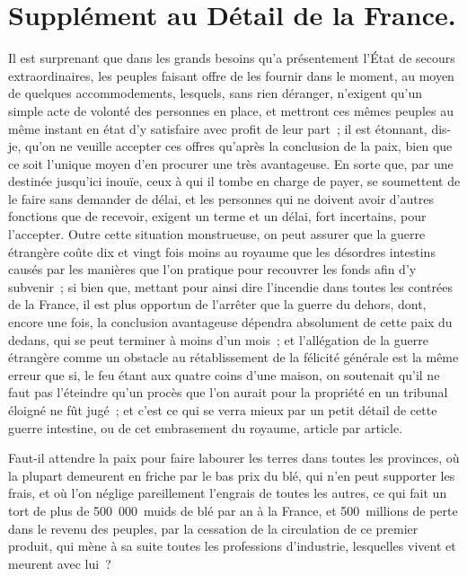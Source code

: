 \documentclass[french,twoside]{book} %
\begin{document}
\section[{Supplément au Détail de la France.}]{Supplément au Détail de la France.}
\noindent Il est surprenant que dans les grands besoins qu’a présentement l’État de secours extraordinaires, les peuples faisant offre de les fournir dans le moment, au moyen de quelques accommodements, lesquels, sans rien déranger, n’exigent qu’un simple acte de volonté des personnes en place, et mettront ces mêmes peuples au même instant en état d’y satisfaire avec profit de leur part ; il est étonnant, dis-je, qu’on ne veuille accepter ces offres qu’après la conclusion de la paix, bien que ce soit l’unique moyen d’en procurer une très avantageuse. En sorte que, par une destinée jusqu’ici inouïe, ceux à qui il tombe en charge de payer, se soumettent de le faire sans demander de délai, et les personnes qui ne doivent avoir d’autres fonctions que de recevoir, exigent un terme et un délai, fort incertains, pour l’accepter. Outre cette situation monstrueuse, on peut assurer que la guerre étrangère coûte dix et vingt fois moins au royaume que les désordres intestins causés par les manières que l’on pratique pour recouvrer les fonds afin d’y subvenir ; si bien que, mettant pour ainsi dire l’incendie dans toutes les contrées de la France, il est plus opportun de l’arrêter que la guerre du dehors, dont, encore une fois, la conclusion avantageuse dépendra absolument de cette paix du dedans, qui se peut terminer à moins d’un mois ; et l’allégation de la guerre étrangère comme un obstacle au rétablissement de la félicité générale est la même erreur que si, le feu étant aux quatre coins d’une maison, on soutenait qu’il ne faut pas l’éteindre qu’un procès que l’on aurait pour la propriété en un tribunal éloigné ne fût jugé ; et c’est ce qui se verra mieux par un petit détail de cette guerre intestine, ou de cet embrasement du royaume, article par article.\par
Faut-il attendre la paix pour faire labourer les terres dans toutes les provinces, où la plupart demeurent en friche par le bas prix du blé, qui n’en peut supporter les frais, et où l’on néglige pareillement l’engrais de toutes les autres, ce qui fait un tort de plus de 500 000 muids de blé par an à la France, et 500 millions de perte dans le revenu des peuples, par la cessation de la circulation de ce premier produit, qui mène à sa suite toutes les professions d’industrie, lesquelles vivent et meurent avec lui ?\par
\end{document}
